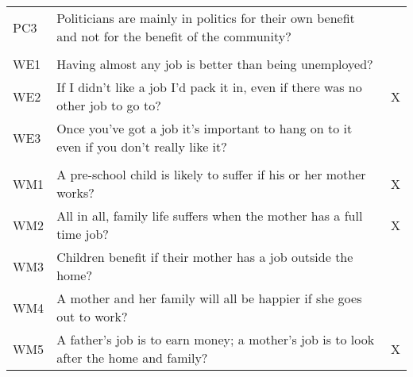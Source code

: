 \begin{tabular}{lll}
\hspace{1em}PC3 & Politicians are mainly in politics for their own benefit and not for the benefit of the community? & \\
\addlinespace[0.3em]
\multicolumn{3}{l}{\textbf{Work-Ethic (WE)}}\\
\hline
\hspace{1em}WE1 & Having almost any job is better than being unemployed? & \\
\hspace{1em}WE2 & If I didn't like a job I'd pack it in, even if there was no other job to go to? & X\\
\hspace{1em}WE3 & Once you've got a job it's important to hang on to it even if you don't really like it? & \\
\addlinespace[0.3em]
\multicolumn{3}{l}{\textbf{Working Mother (WM)}}\\
\hline
\hspace{1em}WM1 & A pre-school child is likely to suffer if his or her mother works? & X\\
\hspace{1em}WM2 & All in all, family life suffers when the mother has a full time job? & X\\
\hspace{1em}WM3 & Children benefit if their mother has a job outside the home? & \\
\hspace{1em}WM4 & A mother and her family will all be happier if she goes out to work? & \\
\hspace{1em}WM5 & A father's job is to earn money; a mother's job is to look after the home and family? & X\\
\bottomrule
\end{tabular}
